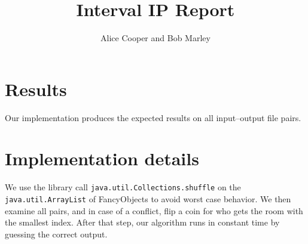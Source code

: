 \documentclass{tufte-handout}
\title{Interval IP Report}
\author{Alice Cooper and Bob Marley}
\begin{document}
  \maketitle

  \section{Results}

  Our implementation produces the expected results on all
  input--output file pairs.

  \section{Implementation details}

  We use the library call \verb+java.util.Collections.shuffle+ on the
  \verb+java.util.ArrayList+ of FancyObjects to avoid worst case behavior. We
  then examine all pairs, and in case of a conflict, flip a coin for who gets
  the room with the smallest index. After that step, our algorithm runs in
  constant time by guessing the correct output.
\end{document}
